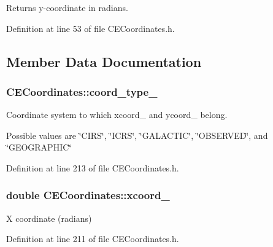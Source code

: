 Returns y-\/coordinate in radians. 



Definition at line 53 of file C\+E\+Coordinates.\+h.



\subsection{Member Data Documentation}
\hypertarget{class_c_e_coordinates_ae2ae938af879ec0aa1fb0e92537bbeed}{}
\subsubsection[{coord\+\_\+type\+\_\+}]{ C\+E\+Coordinates\+::coord\+\_\+type\+\_\+\hspace{0.3cm}{\ttfamily [protected]}}\label{class_c_e_coordinates_ae2ae938af879ec0aa1fb0e92537bbeed}


Coordinate system to which \textquotesingle{}xcoord\+\_\+\textquotesingle{} and \textquotesingle{}ycoord\+\_\+\textquotesingle{} belong. 

Possible values are \char`\"{}\+C\+I\+R\+S\char`\"{}, \char`\"{}\+I\+C\+R\+S\char`\"{}, \char`\"{}\+G\+A\+L\+A\+C\+T\+I\+C\char`\"{}, \char`\"{}\+O\+B\+S\+E\+R\+V\+E\+D\char`\"{}, and \char`\"{}\+G\+E\+O\+G\+R\+A\+P\+H\+I\+C\char`\"{} 

Definition at line 213 of file C\+E\+Coordinates.\+h.

\hypertarget{class_c_e_coordinates_ab58f73988010fb779c262f7b88612fc0}{}
\subsubsection[{xcoord\+\_\+}]{\setlength{\rightskip}{0pt plus 5cm}double C\+E\+Coordinates\+::xcoord\+\_\+\hspace{0.3cm}{\ttfamily [protected]}}\label{class_c_e_coordinates_ab58f73988010fb779c262f7b88612fc0}


X coordinate (radians) 



Definition at line 211 of file C\+E\+Coordinates.\+h.

